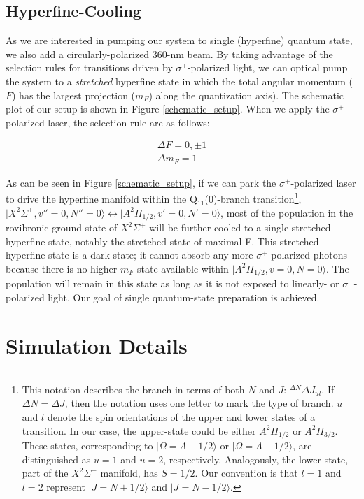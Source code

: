 \documentclass[nofootinbib,aip,jcp,reprint]{revtex4-1}
\begin{document}
\subsection{Hyperfine-Cooling}
As we are interested in pumping our system to single (hyperfine) quantum state, we also add a circularly-polarized 360-nm beam. By taking advantage of the selection rules for transitions driven by $\sigma^+$-polarized light, we can optical pump the system to a \textit{stretched} hyperfine state in which the total angular momentum ($F$) has the largest projection ($m_F$) along the quantization axis). The schematic plot of our setup is shown in Figure \ref{schematic_setup}. When we apply the $\sigma^+$-polarized laser, the selection rule are as follows:

\begin{align*}
\Delta F=0, \pm 1 \\
\Delta m_F=1
\end{align*}

As can be seen in Figure \ref{schematic_setup}, if we can park the $\sigma^+$-polarized laser to drive the hyperfine manifold within the Q$_{11}$(0)-branch transition\footnote[1]{This notation describes the branch in terms of both $N$ and $J$: $^{\Delta N}\Delta J_{ul}$. If $\Delta N = \Delta J$, then the notation uses one letter to mark the type of branch. $u$ and $l$ denote the spin orientations of the upper and lower states of a transition. In our case, the upper-state could be either $A^2\Pi_{1/2}$ or $A^2\Pi_{3/2}$. These states, corresponding to $\lvert \Omega=\Lambda +1/2 \rangle$ or $\lvert \Omega=\Lambda -1/2 \rangle$, are distinguished as $u=1$ and $u=2$, respectively. Analogously, the lower-state, part of the $X^2 \Sigma^{+}$ manifold, has $S=1/2$. Our convention is that $l=1$ and $l=2$ represent $\lvert J=N+1/2 \rangle$ and $\lvert J=N-1/2 \rangle$.}, $\lvert X^2\Sigma^+, v''=0, N''=0\rangle \leftrightarrow \lvert A^2\Pi_{1/2}, v'=0, N'=0\rangle$, most of the population in the rovibronic ground state of $X^2 \Sigma^{+}$ will be further cooled to a single stretched hyperfine state, notably the stretched state of maximal F. This stretched hyperfine state is a dark state; it cannot absorb any more $\sigma^+$-polarized photons because there is no higher $m_F$-state available within $\lvert A^2\Pi_{1/2}, v=0, N=0\rangle$. The population will remain in this state as long as it is not exposed to linearly- or $\sigma^-$-polarized light. Our goal of single quantum-state preparation is achieved.

\section{Simulation Details}
\end{document}
